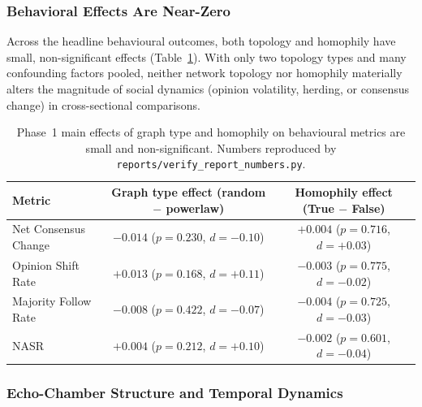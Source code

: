 \documentclass[11pt]{article}
\begin{document}
\subsubsection{Behavioral Effects Are Near-Zero}

Across the headline behavioural outcomes, both topology and homophily have small, non-significant effects (Table~\ref{tab:main_effects_near_zero}). With only two topology types and many confounding factors pooled, neither network topology nor homophily materially alters the magnitude of social dynamics (opinion volatility, herding, or consensus change) in cross-sectional comparisons.

\begin{table}[h]
\centering
\begin{tabular}{lcc}
\toprule
Metric & Graph type effect (random $-$ powerlaw) & Homophily effect (True $-$ False) \\
\midrule
Net Consensus Change & $-0.014$ ($p = 0.230$, $d = -0.10$) & $+0.004$ ($p = 0.716$, $d = +0.03$) \\
Opinion Shift Rate   & $+0.013$ ($p = 0.168$, $d = +0.11$) & $-0.003$ ($p = 0.775$, $d = -0.02$) \\
Majority Follow Rate & $-0.008$ ($p = 0.422$, $d = -0.07$) & $-0.004$ ($p = 0.725$, $d = -0.03$) \\
NASR                 & $+0.004$ ($p = 0.212$, $d = +0.10$) & $-0.002$ ($p = 0.601$, $d = -0.04$) \\
\bottomrule
\end{tabular}
\caption{Phase~1 main effects of graph type and homophily on behavioural metrics are small and non-significant. Numbers reproduced by \texttt{reports/verify\_report\_numbers.py}.}
\label{tab:main_effects_near_zero}
\end{table}

\subsubsection{Echo-Chamber Structure and Temporal Dynamics}
\end{document}
